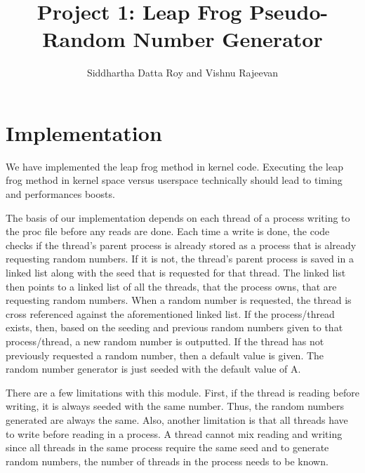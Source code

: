 \documentclass[12pt]{article}
\begin{document}
\title{Project 1: Leap Frog Pseudo-Random Number Generator}
\author{Siddhartha Datta Roy and Vishnu Rajeevan}
\maketitle
\newpage
\section*{Implementation}
	We have implemented the leap frog method in kernel code.
	Executing the leap frog method in kernel space versus userspace technically should lead to timing and performances boosts.

	The basis of our implementation depends on each thread of a process writing to the proc file before any reads are done.
	Each time a write is done, the code checks if the thread's parent process is already stored as a process that is already requesting random numbers.
	If it is not, the thread's parent process is saved in a linked list along with the seed that is requested for that thread.
	The linked list then points to a linked list of all the threads, that the process owns, that are requesting random numbers.
	When a random number is requested, the thread is cross referenced against the aforementioned linked list.
	If the process/thread exists, then, based on the seeding and previous random numbers given to that process/thread, a new random number is outputted.
	If the thread has not previously requested a random number, then a default value is given. 
	The random number generator is just seeded with the default value of A.

	There are a few limitations with this module. First, if the thread is reading before writing, it is always seeded with the same number. 
	Thus, the random numbers generated are always the same.
	Also, another limitation is that all threads have to write before reading in a process.
	A thread cannot mix reading and writing since all threads in the same process require the same seed and to generate random numbers, the number of threads in the process needs to be known.
\end{document}
